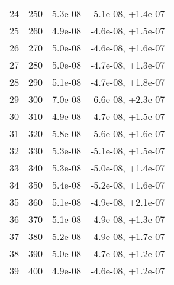 \begin{table}
\begin{adjustbox}{width=1\textwidth/2}
\begin{tabular}{|c|c|c|c|}
\cline{1-4}
24 & 250 & 5.3e-08 & -5.1e-08, +1.4e-07 \\
\cline{1-4}
25 & 260 & 4.9e-08 & -4.6e-08, +1.5e-07 \\
\cline{1-4}
26 & 270 & 5.0e-08 & -4.6e-08, +1.6e-07 \\
\cline{1-4}
27 & 280 & 5.0e-08 & -4.7e-08, +1.3e-07 \\
\cline{1-4}
28 & 290 & 5.1e-08 & -4.7e-08, +1.8e-07 \\
\cline{1-4}
29 & 300 & 7.0e-08 & -6.6e-08, +2.3e-07 \\
\cline{1-4}
30 & 310 & 4.9e-08 & -4.7e-08, +1.5e-07 \\
\cline{1-4}
31 & 320 & 5.8e-08 & -5.6e-08, +1.6e-07 \\
\cline{1-4}
32 & 330 & 5.3e-08 & -5.1e-08, +1.5e-07 \\
\cline{1-4}
33 & 340 & 5.3e-08 & -5.0e-08, +1.4e-07 \\
\cline{1-4}
34 & 350 & 5.4e-08 & -5.2e-08, +1.6e-07 \\
\cline{1-4}
35 & 360 & 5.1e-08 & -4.9e-08, +2.1e-07 \\
\cline{1-4}
36 & 370 & 5.1e-08 & -4.9e-08, +1.3e-07 \\
\cline{1-4}
37 & 380 & 5.2e-08 & -4.9e-08, +1.7e-07 \\
\cline{1-4}
38 & 390 & 5.0e-08 & -4.7e-08, +1.2e-07 \\
\cline{1-4}
39 & 400 & 4.9e-08 & -4.6e-08, +1.2e-07 \\
\cline{1-4}
\end{tabular}
\end{adjustbox}
\end{table}

